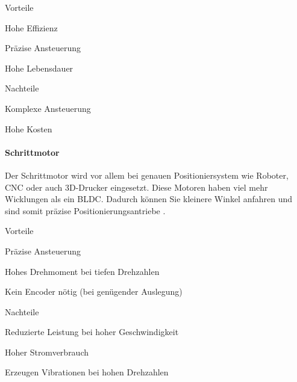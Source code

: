 \documentclass[../main.tex]{subfiles}
\begin{document}
\begin{minipage}[t]{0.48\textwidth}
\begin{items}
  \item [Vorteile]
  \item Hohe Effizienz
  \item Präzise Ansteuerung
  \item Hohe Lebensdauer
\end{items}
\end{minipage}
\hfill
\begin{minipage}[t]{0.48\textwidth}
\begin{items}
  \item [Nachteile]
  \item Komplexe Ansteuerung
  \item Hohe Kosten
\end{items}
\end{minipage}


\paragraph{Schrittmotor}

Der Schrittmotor wird vor allem bei genauen Positioniersystem wie Roboter, CNC oder auch 3D-Drucker eingesetzt. Diese Motoren haben viel mehr Wicklungen als ein BLDC. Dadurch können Sie kleinere Winkel anfahren und sind somit präzise Positionierungsantriebe \cite{schrittmotor}. 

\begin{minipage}[t]{0.48\textwidth}
\begin{items}
  \item [Vorteile]
  \item Präzise Ansteuerung
  \item Hohes Drehmoment bei tiefen Drehzahlen
  \item Kein Encoder nötig (bei genügender Auslegung)
\end{items}
\end{minipage}
\hfill
\begin{minipage}[t]{0.48\textwidth}
\begin{items}
  \item [Nachteile]
  \item Reduzierte Leistung bei hoher Geschwindigkeit
  \item Hoher Stromverbrauch
  \item Erzeugen Vibrationen bei hohen Drehzahlen
\end{items}
\end{minipage}
\end{document}
